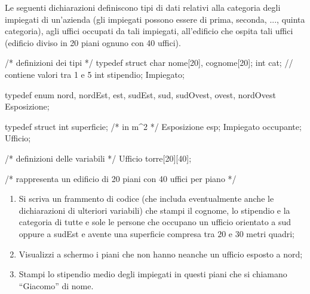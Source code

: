 \begin{Exercise}[label={ex:azienda}]
		Le seguenti dichiarazioni definiscono tipi di dati relativi alla categoria degli impiegati di un'azienda (gli impiegati possono essere di prima, seconda, ..., quinta categoria), agli uffici occupati da tali impiegati, all'edificio che ospita tali uffici (edificio diviso in 20 piani ognuno con 40 uffici).

		\begin{clang}
/* definizioni dei tipi */
typedef struct {
  char nome[20], cognome[20];
  int cat; // contiene valori tra 1 e 5
  int stipendio;
} Impiegato;

typedef enum{
  nord, nordEst, est, sudEst, sud, sudOvest, ovest, nordOvest
} Esposizione;

typedef struct {
  int superficie; /* in m^2 */
  Esposizione esp;
  Impiegato occupante;
} Ufficio;

/* definizioni delle variabili */
Ufficio torre[20][40];

/* rappresenta un edificio di 20 piani con 40 uffici per piano */
		\end{clang}

\begin{enumerate}
		\item Si scriva un frammento di codice (che includa eventualmente anche le dichiarazioni di ulteriori variabili) che stampi il cognome, lo stipendio e la categoria di tutte e sole le persone che occupano un ufficio orientato a sud oppure a sudEst e avente una superficie compresa tra $20$ e $30$ metri quadri;
  	\item Visualizzi a schermo i piani che non hanno neanche un ufficio esposto a nord;
  	\item Stampi lo stipendio medio degli impiegati in questi piani che si chiamano ``Giacomo'' di nome.
\end{enumerate}
\end{Exercise}

\begin{Answer}[ref={ex:azienda}]
  
  
  
\end{Answer}